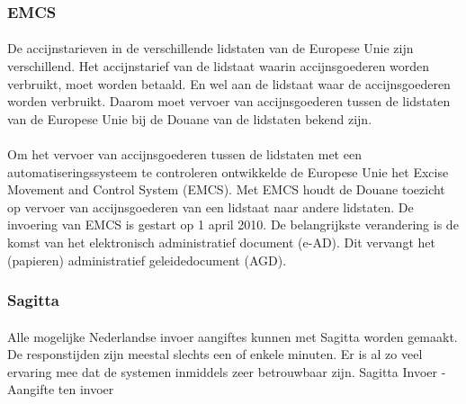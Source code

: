 \subsubsection {EMCS}

\paragraph {} De accijnstarieven in de verschillende lidstaten van de Europese Unie zijn
verschillend. Het accijnstarief van de lidstaat waarin accijnsgoederen worden verbruikt,
moet worden betaald. En wel aan de lidstaat waar de accijnsgoederen worden verbruikt.
Daarom moet vervoer van accijnsgoederen tussen de lidstaten van de Europese Unie bij de
Douane van de lidstaten bekend zijn.

\paragraph {} Om het vervoer van accijnsgoederen tussen de lidstaten met een
automatiseringssysteem te controleren ontwikkelde de Europese Unie het Excise Movement and
Control System (EMCS). Met EMCS houdt de Douane toezicht op vervoer van accijnsgoederen
van een lidstaat naar andere lidstaten. De invoering van EMCS is gestart op 1 april 2010.
De belangrijkste verandering is de komst van het elektronisch administratief document
(e-AD). Dit vervangt het (papieren) administratief geleidedocument (AGD).


\subsubsection {Sagitta}

\paragraph {} Alle mogelijke Nederlandse invoer aangiftes kunnen met Sagitta worden
gemaakt. De responstijden zijn meestal slechts een of enkele minuten. Er is al zo veel
ervaring mee dat de systemen inmiddels zeer betrouwbaar zijn. Sagitta Invoer - Aangifte
ten invoer

